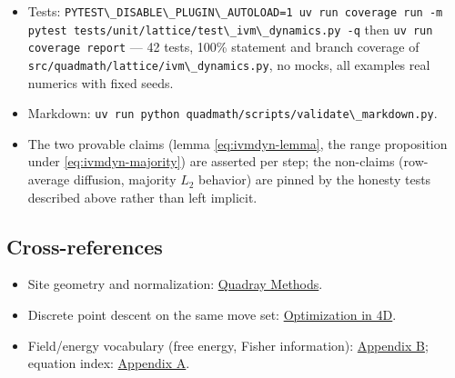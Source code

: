 \documentclass[
  10pt,
]{article}
\newcommand{\passthrough}[1]{#1}
\providecommand{\tightlist}{%
  \setlength{\itemsep}{0pt}\setlength{\parskip}{0pt}}
\begin{document}
\begin{itemize}
\tightlist
\item
  Tests:
  \passthrough{\lstinline!PYTEST\_DISABLE\_PLUGIN\_AUTOLOAD=1 uv run coverage run -m pytest tests/unit/lattice/test\_ivm\_dynamics.py -q!}
  then \passthrough{\lstinline!uv run coverage report!} --- 42 tests,
  100\% statement and branch coverage of
  \passthrough{\lstinline!src/quadmath/lattice/ivm\_dynamics.py!}, no
  mocks, all examples real numerics with fixed seeds.
\item
  Markdown:
  \passthrough{\lstinline!uv run python quadmath/scripts/validate\_markdown.py!}.
\item
  The two provable claims (lemma \eqref{eq:ivmdyn-lemma}, the range
  proposition under \eqref{eq:ivmdyn-majority}) are asserted per step;
  the non-claims (row-average diffusion, majority \(L_2\) behavior) are
  pinned by the honesty tests described above rather than left implicit.
\end{itemize}

\subsection{Cross-references}\label{cross-references}

\begin{itemize}
\tightlist
\item
  Site geometry and normalization: \href{03_quadray_methods.md}{Quadray
  Methods}.
\item
  Discrete point descent on the same move set:
  \href{04_optimization_in_4d.md}{Optimization in 4D}.
\item
  Field/energy vocabulary (free energy, Fisher information):
  \href{09_free_energy_active_inference.md}{Appendix B}; equation index:
  \href{08_equations_appendix.md}{Appendix A}.
\end{itemize}
\end{document}

